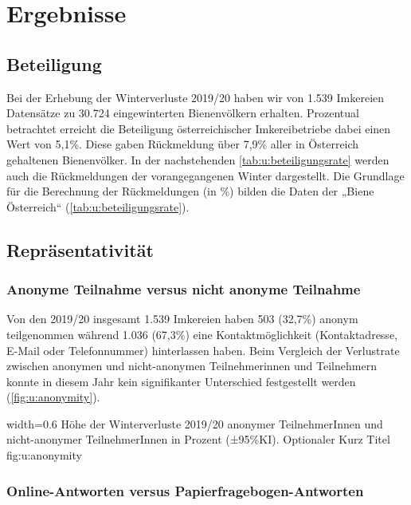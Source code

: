 \section{Ergebnisse}
\subsection{Beteiligung}

Bei der Erhebung der Winterverluste 2019/20 haben wir von 1.539 Imkereien Datensätze zu 30.724 eingewinterten Bienenvölkern erhalten. Prozentual betrachtet erreicht die Beteiligung österreichischer Imkereibetriebe dabei einen Wert von 5,1\%. Diese gaben Rückmeldung über 7,9\% aller in Österreich gehaltenen Bienenvölker. In der nachstehenden \cref{tab:u:beteiligungsrate} werden auch die Rückmeldungen der vorangegangenen Winter dargestellt. Die Grundlage für die Berechnung der Rückmeldungen (in \%) bilden die Daten der „Biene Österreich`` (\cref{tab:u:beteiligungsrate}).



\subsection{Repräsentativität}
\subsubsection{Anonyme Teilnahme versus nicht anonyme Teilnahme}

Von den 2019/20 insgesamt 1.539 Imkereien haben 503 (32,7\%) anonym teilgenommen während 1.036 (67,3\%) eine Kontaktmöglichkeit (Kontaktadresse, E-Mail oder Telefonnummer) hinterlassen haben. Beim Vergleich der Verlustrate zwischen anonymen  und nicht-anonymen Teilnehmerinnen und Teilnehmern  konnte in diesem Jahr kein signifikanter Unterschied festgestellt werden (\cref{fig:u:anonymity}).

  {width=0.6\textwidth} %
  {Höhe der Winterverluste 2019/20 anonymer TeilnehmerInnen und nicht-anonymer Teilnehmer\-Innen in Prozent (±95\%KI).} %
  {Optionaler Kurz Titel} %
  {fig:u:anonymity} %
  

\subsubsection{Online-Antworten versus Papierfragebogen-Antworten}

